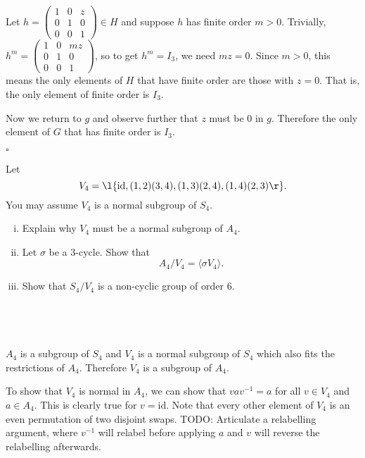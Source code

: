 \documentclass[a4paper]{article}
\begin{document}
Let $h = \begin{pmatrix} 1 & 0 & z \\ 0 & 1 & 0 \\ 0 & 0 & 1 \end{pmatrix} \in H$ and suppose $h$ has finite order $m > 0$. Trivially, $h^m = \begin{pmatrix} 1 & 0 & mz \\ 0 & 1 & 0 \\ 0 & 0 & 1 \end{pmatrix}$, so to get $h^m = I_3$, we need $mz = 0$. Since $m > 0$, this means the only elements of $H$ that have finite order are those with $z = 0$. That is, the only element of finite order is $I_3$.

Now we return to $g$ and observe further that $z$ must be 0 in $g$. Therefore the only element of $G$ that has finite order is $I_3$.

\hfill $\square$



\begin{questionbody}
Let \[
V_4 = \l\{ \mathrm{id}, (1,2)(3,4), (1,3)(2,4), (1,4)(2,3) \r\}.
\] You may assume $V_4$ is a normal subgroup of $S_4$.
%
\begin{enumerate}[(i)]
\item Explain why $V_4$ must be a normal subgroup of $A_4$.

\item Let $\sigma$ be a 3-cycle. Show that \[ A_4 / V_4 = \langle \sigma V_4 \rangle . \]

\item Show that $S_4 / V_4$ is a non-cyclic group of order 6.
\end{enumerate}
\end{questionbody}

\subsection{~} %

$A_4$ is a subgroup of $S_4$ and $V_4$ is a normal subgroup of $S_4$ which also fits the restrictions of $A_4$. Therefore $V_4$ is a subgroup of $A_4$.

To show that $V_4$ is normal in $A_4$, we can show that $v a v^{-1} = a$ for all $v \in V_4$ and $a \in A_4$. This is clearly true for $v = \mathrm{id}$. Note that every other element of $V_4$ is an even permutation of two disjoint swaps. %
TODO\@: Articulate a relabelling argument, where $v^{-1}$ will relabel before applying $a$ and $v$ will reverse the relabelling afterwards.
\end{document}
